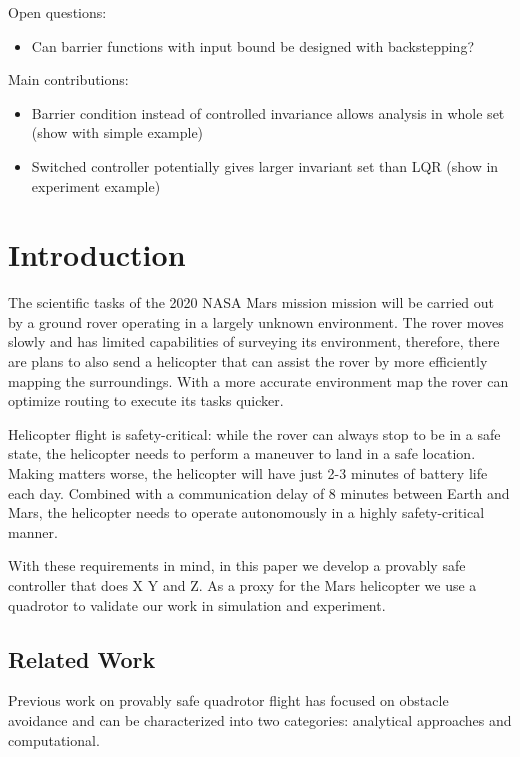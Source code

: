 \documentclass[conference]{IEEEtran}
\begin{document}
Open questions:
\begin{itemize}
  \item Can barrier functions with input bound be designed with backstepping?
\end{itemize}

Main contributions:
\begin{itemize}
    \item Barrier condition instead of controlled invariance allows analysis in whole set (show with simple example)
    \item Switched controller potentially gives larger invariant set than LQR (show in experiment example)
\end{itemize}

\section{Introduction} \label{subsec:intro}

The scientific tasks of the 2020 NASA Mars mission mission will be carried out by a ground rover operating in a largely unknown environment. The rover moves slowly and has limited capabilities of surveying its environment, therefore, there are plans to also send a helicopter that can assist the rover by more efficiently mapping the surroundings. With a more accurate environment map the rover can optimize routing to execute its tasks quicker.

Helicopter flight is safety-critical: while the rover can always stop to be in a safe state, the helicopter needs to perform a maneuver to land in a safe location. Making matters worse, the helicopter will have just 2-3 minutes of battery life each day. Combined with a communication delay of 8 minutes between Earth and Mars, the helicopter needs to operate autonomously in a highly safety-critical manner.

With these requirements in mind, in this paper we develop a provably safe controller that does X Y and Z. As a proxy for the Mars helicopter we use a quadrotor to validate our work in simulation and experiment.   


\subsection{Related Work}

Previous work on provably safe quadrotor flight has focused on obstacle avoidance and can be characterized into two categories: analytical approaches and computational.
\end{document}
